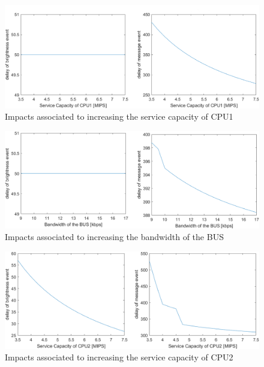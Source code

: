 \begin{figure}
    \centering
    \includegraphics[width=\columnwidth]{graphics/bottleneckB1.png}
    \caption{Impacts associated to increasing the service capacity of CPU1}\label{fig:bottleneck-B1}
\end{figure}

\begin{figure}
    \centering
    \includegraphics[width=\columnwidth]{graphics/bottleneckB2.png}
    \caption{Impacts associated to increasing the bandwidth of the BUS}\label{fig:bottleneck-B2}
\end{figure}

\begin{figure}
    \centering
    \includegraphics[width=\columnwidth]{graphics/bottleneckB3.png}
    \caption{Impacts associated to increasing the service capacity of CPU2}\label{fig:bottleneck-B3}
\end{figure}
